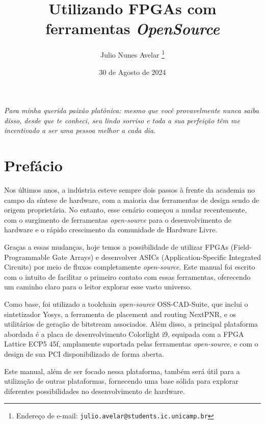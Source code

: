 \documentclass{report}
\title{Utilizando FPGAs com ferramentas \textit{OpenSource}}
\author{Julio Nunes Avelar %
    \thanks{Endereço de e-mail: \texttt{julio.avelar@students.ic.unicamp.br}}}
\affil{Departamento de sistemas de computação, Universidade estadual de campinas}
\date{30 de Agosto de 2024}
\begin{document}
\maketitle

\newpage
\thispagestyle{empty}  %
\vspace*{7cm}  %
\begin{flushright}
    \textit{Para minha querida paixão platônica: mesmo que você provavelmente nunca saiba disso, desde que te conheci, seu lindo sorriso e toda a sua perfeição têm me incentivado a ser uma pessoa melhor a cada dia.}  %
\end{flushright}

\chapter*{Prefácio}

Nos últimos anos, a indústria esteve sempre dois passos à frente da academia no campo da síntese de hardware, com a maioria das ferramentas de design sendo de origem proprietária. No entanto, esse cenário começou a mudar recentemente, com o surgimento de ferramentas \textit{open-source} para o desenvolvimento de hardware e o rápido crescimento da comunidade de Hardware Livre.

Graças a essas mudanças, hoje temos a possibilidade de utilizar FPGAs (Field-Programmable Gate Arrays) e desenvolver ASICs (Application-Specific Integrated Circuits) por meio de fluxos completamente \textit{open-source}. Este manual foi escrito com o intuito de facilitar o primeiro contato com essas ferramentas, oferecendo um caminho claro para o leitor explorar esse vasto universo.

Como base, foi utilizado a toolchain \textit{open-source} OSS-CAD-Suite, que inclui o sintetizador Yosys, a ferramenta de placement and routing NextPNR, e os utilitários de geração de bitstream associados. Além disso, a principal plataforma abordada é a placa de desenvolvimento Colorlight i9, equipada com a FPGA Lattice ECP5 45f, amplamente suportada pelas ferramentas \textit{open-source}, e com o design de sua PCI disponibilizado de forma aberta.

Este manual, além de ser focado nessa plataforma, também será útil para a utilização de outras plataformas, fornecendo uma base sólida para explorar diferentes possibilidades no desenvolvimento de hardware.
\end{document}
